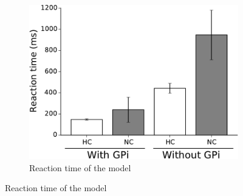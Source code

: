 \begin{figure}[h]
        \centering
        \begin{subfigure}[b]{0.4\textwidth}
                \includegraphics[width=\textwidth]{RTresults}
                
        		  \vspace{2mm}
                \caption{Reaction time of the model}
                \label{fig:RTresults}
        \end{subfigure}
        \vspace{4mm}
        

\end{figure}
